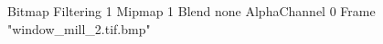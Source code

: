 {Bitmap
	{Filtering 1}
	{Mipmap 1}
	{Blend none}
	{AlphaChannel 0}
	{Frame "window_mill_2.tif.bmp"}
}
